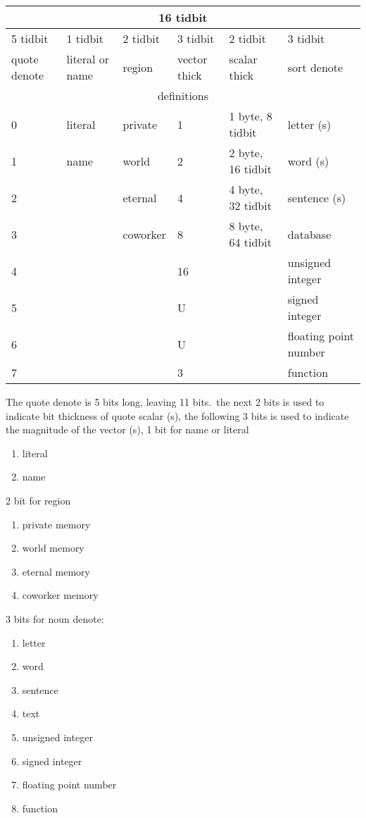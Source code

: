 \documentclass[12pt]{report}
\begin{document}
\begin{tabular}{*{6}{l}}
\toprule
\multicolumn{6}{|c|}{16 tidbit}\\
\midrule
5 tidbit     & 1 tidbit & 2 tidbit            & 3 tidbit        & 2 tidbit & 3 tidbit \\
\midrule
quote denote & literal or name & region & vector thick & scalar thick & sort denote \\
\midrule
\midrule
\multicolumn{6}{|c|}{definitions}\\
\bottomrule
0            & literal& private  & 1  & 1 byte, 8 tidbit      & letter (s) \\
1            & name   & world    & 2 & 2 byte, 16 tidbit     & word (s) \\
2            &        & eternal  & 4 & 4 byte, 32 tidbit     & sentence (s) \\
3            &        & coworker & 8     & 8 byte, 64 tidbit     & database \\
4            &         & & 16                                  & & unsigned integer \\
5            &         & & U                                   & & signed integer \\
6            &         & & U                                   & & floating point number \\
7            &         & & 3                                   & & function \\
\bottomrule
\end{tabular}
The quote denote is 5 bits long, leaving 11 bits.\
the next 2 bits is used to indicate bit thickness of quote scalar (s),
the following 3 bits is used to indicate the magnitude of the vector (s),
1 bit for name or literal
\begin{enumerate}
  \setcounter{enumi}{0} 
  \item literal
  \item name
\end{enumerate}

2 bit for region
\begin{enumerate}
  \setcounter{enumi}{0} 
  \item private memory
  \item world memory 
  \item eternal memory 
  \item coworker memory 
\end{enumerate}
3 bits for noun denote:
\begin{enumerate}
  \setcounter{enumi}{0}
  \item letter
  \item word
  \item sentence
  \item text
  \item unsigned integer
  \item signed integer
  \item floating point number
  \item function
\end{enumerate}
\end{document}
